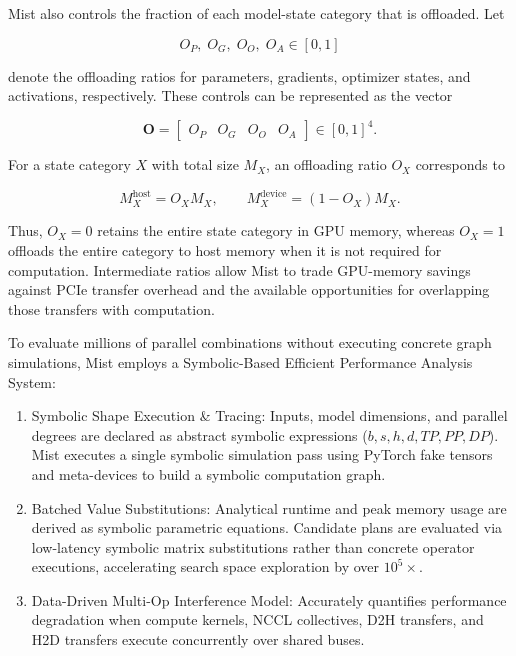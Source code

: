 \documentclass[11pt,journal,final, onecolumn]{IEEEtran}
\begin{document}
Mist also controls the fraction of each model-state category that is offloaded.
Let

\begin{equation}
    O_P,\; O_G,\; O_O,\; O_A \in [0,1]
    \label{eq:mist-offload-ratios}
\end{equation}

denote the offloading ratios for parameters, gradients, optimizer states, and
activations, respectively. These controls can be represented as the vector

\begin{equation}
    \mathbf{O}
    =
    \begin{bmatrix}
        O_P & O_G & O_O & O_A
    \end{bmatrix}
    \in [0,1]^4.
    \label{eq:mist-offload-vector}
\end{equation}

For a state category \(X\) with total size \(M_X\), an offloading ratio \(O_X\)
corresponds to

\begin{equation}
    M_X^{\mathrm{host}} = O_X M_X,
    \qquad
    M_X^{\mathrm{device}} = (1-O_X)M_X.
    \label{eq:mist-offload-memory}
\end{equation}

Thus, \(O_X=0\) retains the entire state category in GPU memory, whereas
\(O_X=1\) offloads the entire category to host memory when it is not required
for computation. Intermediate ratios allow Mist to trade GPU-memory savings
against PCIe transfer overhead and the available opportunities for overlapping
those transfers with computation.

To evaluate millions of parallel combinations without executing concrete graph simulations, Mist employs a Symbolic-Based Efficient Performance Analysis System:

\begin{enumerate}
    \item Symbolic Shape Execution \& Tracing: Inputs, model dimensions, and parallel degrees are declared as abstract symbolic expressions ($b, s, h, d, TP, PP, DP$). Mist executes a single symbolic simulation pass using PyTorch fake tensors and meta-devices to build a symbolic computation graph.
    \item Batched Value Substitutions: Analytical runtime and peak memory usage are derived as symbolic parametric equations. Candidate plans are evaluated via low-latency symbolic matrix substitutions rather than concrete operator executions, accelerating search space exploration by over $10^5 \times$.
    \item Data-Driven Multi-Op Interference Model: Accurately quantifies performance degradation when compute kernels, NCCL collectives, D2H transfers, and H2D transfers execute concurrently over shared buses.
\end{enumerate}
\end{document}
